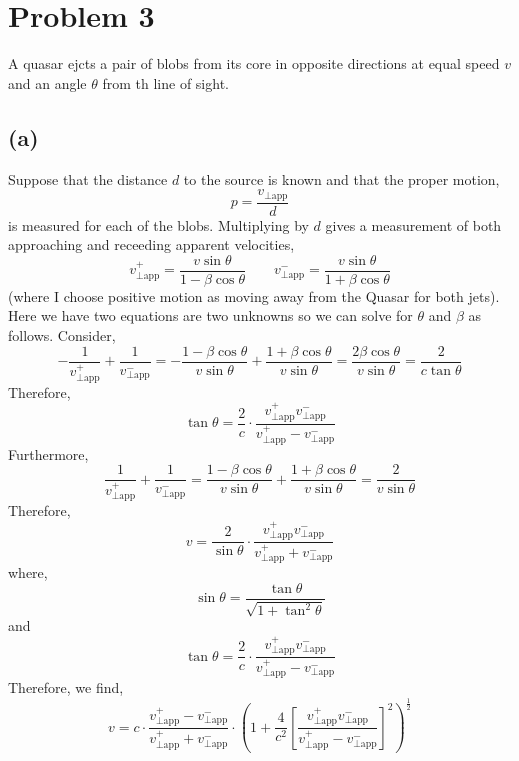 \documentclass[12pt]{article}
\begin{document}
\section{Problem 3}

A quasar ejcts a pair of blobs from its core in opposite directions at equal speed $v$ and an angle $\theta$ from th line of sight. 

\subsection*{(a)}

Suppose that the distance $d$ to the source is known and that the proper motion,
\[ p = \frac{v_{\perp \text{app}}}{d} \]
is measured for each of the blobs. Multiplying by $d$ gives a measurement of both approaching and receeding apparent velocities,
\[ v_{\perp \text{app}}^{+} = \frac{v \sin{\theta}}{1 - \beta \cos{\theta}} \quad \quad  v_{\perp \text{app}}^{-} = \frac{v \sin{\theta}}{1 + \beta \cos{\theta}}  \] 
(where I choose positive motion as moving away from the Quasar for both jets).
Here we have two equations are two unknowns so we can solve for $\theta$ and $\beta$ as follows. Consider,
\[ - \frac{1}{v_{\perp \text{app}}^{+}} + \frac{1}{v_{\perp \text{app}}^{-}} = - \frac{1 - \beta \cos{\theta}}{v \sin{\theta}} + \frac{1 + \beta \cos{\theta}}{v \sin{\theta}} =  \frac{2 \beta \cos{\theta}}{v \sin{\theta}} =  \frac{2}{c \tan{\theta}} \]
Therefore,
\[ \tan{\theta} = \frac{2}{c} \cdot \frac{v_{\perp \text{app}}^{+} v_{\perp \text{app}}^{-}}{v_{\perp \text{app}}^{+} - v_{\perp \text{app}}^{-}} \]
Furthermore,
\[ \frac{1}{v_{\perp \text{app}}^{+}} + \frac{1}{v_{\perp \text{app}}^{-}} = \frac{1 - \beta \cos{\theta}}{v \sin{\theta}} + \frac{1 + \beta \cos{\theta}}{v \sin{\theta}} =  \frac{2}{v \sin{\theta}} \]
Therefore,
\[ v = \frac{2}{\sin{\theta}} \cdot \frac{v_{\perp \text{app}}^{+} v_{\perp \text{app}}^{-}}{v_{\perp \text{app}}^{+} + v_{\perp \text{app}}^{-}} \]
where,
\[ \sin{\theta} = \frac{\tan{\theta}}{\sqrt{1 + \tan^2{\theta}}} \]
and 
\[ \tan{\theta} = \frac{2}{c} \cdot \frac{v_{\perp \text{app}}^{+} v_{\perp \text{app}}^{-}}{v_{\perp \text{app}}^{+} - v_{\perp \text{app}}^{-}} \]
Therefore, we find,
\[ v = c \cdot \frac{v_{\perp \text{app}}^{+} - v_{\perp \text{app}}^{-}}{v_{\perp \text{app}}^{+} + v_{\perp \text{app}}^{-}} \cdot \left( 1 + \frac{4}{c^2} \left[ \frac{v_{\perp \text{app}}^{+} v_{\perp \text{app}}^{-}}{v_{\perp \text{app}}^{+} - v_{\perp \text{app}}^{-}} \right]^2 \right)^{\frac{1}{2}} \]
\end{document}
